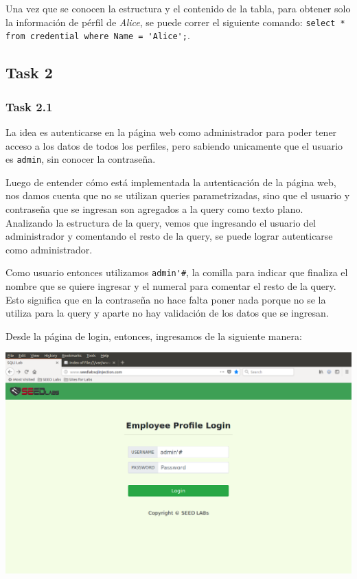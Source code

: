 \documentclass[11pt]{article}
\begin{document}
Una vez que se conocen la estructura y el contenido de la tabla, para obtener solo la información de pérfil
de \textit{Alice}, se puede correr el siguiente comando: \verb|select * from credential where Name = 'Alice';|.

\subsection*{Task 2}

\subsubsection*{Task 2.1}
La idea es autenticarse en la página web como administrador para poder tener acceso a los datos de todos los 
perfiles, pero sabiendo unicamente que el usuario es \verb|admin|, sin conocer la contraseña.

Luego de entender cómo está implementada la autenticación de la página web, nos damos cuenta que no se utilizan 
queries parametrizadas, sino que el usuario y contraseña que se ingresan son agregados a la query como texto plano.
Analizando la estructura de la query, vemos que ingresando el usuario del administrador y comentando el resto de la
query, se puede lograr autenticarse como administrador.

Como usuario entonces utilizamos \verb|admin'#|, la comilla para indicar que finaliza el nombre que se quiere 
ingresar y el numeral para comentar el resto de la query. Esto significa que en la contraseña no hace falta poner
nada porque no se la utiliza para la query y aparte no hay validación de los datos que se ingresan.

Desde la página de login, entonces, ingresamos de la siguiente manera:
\begin{center}
    \includegraphics[scale=.34]{task2_1_1_sql.png}
\end{center}
\end{document}
